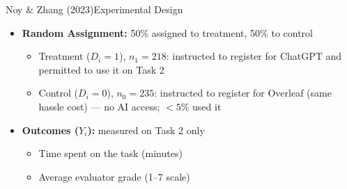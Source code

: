 \documentclass[hyperref={pdfpagelabels=false}]{beamer}
\begin{document}
\begin{frame}{Noy \& Zhang (2023)}{Experimental Design}
	\begin{itemize}
		\item \textbf{Random Assignment:} 50\% assigned to treatment, 50\% to control
		\vspace{0.2cm}
		\begin{itemize}
			\item Treatment ($D_i = 1$), $n_1 = 218$: instructed to register for ChatGPT and permitted to use it on Task 2
			\vspace{0.2cm}
			\item Control ($D_i = 0$), $n_0 = 235$: instructed to register for Overleaf (same hassle cost) --- no AI access; $<5\%$ used it
		\end{itemize}
		\vspace{0.2cm}
		\item \textbf{Outcomes ($Y_i$):} measured on Task 2 only
		\vspace{0.2cm}
		\begin{itemize}
			\item Time spent on the task (minutes)
			\vspace{0.2cm}
			\item Average evaluator grade (1--7 scale)
		\end{itemize}
	\end{itemize}
\end{frame}
	
\end{document}
